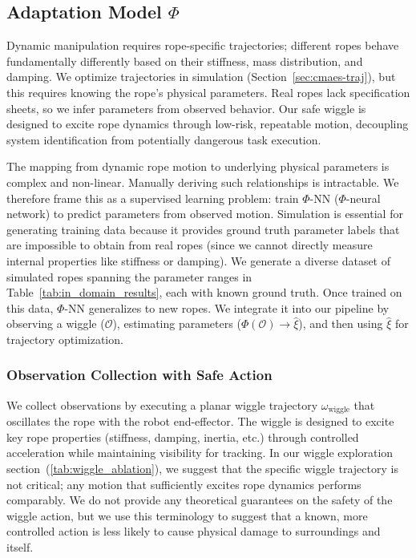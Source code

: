 \documentclass[conference]{IEEEtran}
\begin{document}
\subsection{Adaptation Model $\Phi$}\label{phi_NN}

Dynamic manipulation requires rope-specific trajectories; different ropes behave fundamentally differently based on their stiffness, mass distribution, and damping. We optimize trajectories in simulation (Section~\ref{sec:cmaes-traj}), but this requires knowing the rope's physical parameters. Real ropes lack specification sheets, so we infer parameters from observed behavior. Our safe wiggle is designed to excite rope dynamics through low-risk, repeatable motion, decoupling system identification from potentially dangerous task execution.

The mapping from dynamic rope motion to underlying physical parameters is complex and non-linear. Manually deriving such relationships is intractable. We therefore frame this as a supervised learning problem: train $\Phi$-NN ($\Phi$-neural network) to predict parameters from observed motion. Simulation is essential for generating training data because it provides ground truth parameter labels that are impossible to obtain from real ropes (since we cannot directly measure internal properties like stiffness or damping). We generate a diverse dataset of simulated ropes spanning the parameter ranges in Table~\ref{tab:in_domain_results}, each with known ground truth. Once trained on this data, $\Phi$-NN generalizes to new ropes. We integrate it into our pipeline by observing a wiggle ($\mathcal{O}$), estimating parameters ($\Phi(\mathcal{O}) \rightarrow\hat{\xi}$), and then using $\hat{\xi}$ for trajectory optimization.

\subsubsection{Observation Collection with Safe Action}\label{sec:howtowiggle}

We collect observations by executing a planar wiggle trajectory $\omega_{\text{wiggle}}$ that oscillates the rope with the robot end-effector. The wiggle is designed to excite key rope properties (stiffness, damping, inertia, etc.) through controlled acceleration while maintaining visibility for tracking. In our wiggle exploration section~(\ref{tab:wiggle_ablation}), we suggest that the specific wiggle trajectory is not critical; any motion that sufficiently excites rope dynamics performs comparably. We do not provide any theoretical guarantees on the safety of the wiggle action, but we use this terminology to suggest that a known, more controlled action is less likely to cause physical damage to surroundings and itself.
\end{document}
